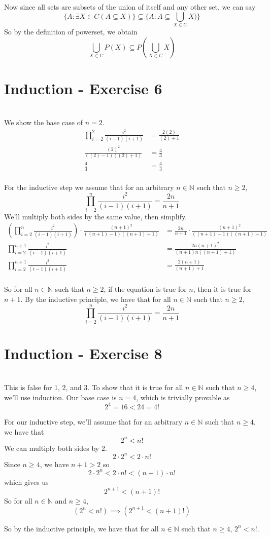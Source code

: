 \documentclass[11pt]{article}
\newcommand{\N}{\mathbb{N}}
\begin{document}
Now since all sets are subsets of the union of itself and any other set, we can say
\[\{A: \exists X\in C(A \subseteq X)\} \subseteq \{A: A \subseteq \bigcup_{X\in C} X)\}\]
So by the definition of powerset, we obtain
\[\displaystyle\bigcup_{X\in C} P(X) \subseteq P(\bigcup_{X\in C} X)\]


\section*{Induction - Exercise 6}
\\

We show the base case of $n=2$.
\begin{align*}
    \prod_{i=2}^2\frac{i^2}{(i-1)(i+1)} &= \frac{2(2)}{(2)+1} \\
    \frac{(2)^2}{((2)-1)((2)+1)} &= \frac{4}{3} \\
    \frac{4}{3} &= \frac{4}{3} \\
\end{align*}

For the inductive step we assume that for an arbitrary $n\in\N$ such that $n\geq2$,
\[\prod_{i=2}^n\frac{i^2}{(i-1)(i+1)} = \frac{2n}{n+1}\]
We'll multiply both sides by the same value, then simplify.
\begin{align*}
    \left(\prod_{i=2}^n\frac{i^2}{(i-1)(i+1)}\right)\cdot\frac{(n+1)^2}{((n+1)-1)((n+1)+1)} &= \frac{2n}{n+1}\cdot\frac{(n+1)^2}{((n+1)-1)((n+1)+1)} \\
    \prod_{i=2}^{n+1}\frac{i^2}{(i-1)(i+1)}&= \frac{2n(n+1)^2}{(n+1)n((n+1)+1)} \\
    \prod_{i=2}^{n+1}\frac{i^2}{(i-1)(i+1)}&= \frac{2(n+1)}{(n+1)+1} \\
\end{align*}

So for all $n\in\N$ such that $n\geq2$, if the equation is true for $n$, then it is true for $n+1$. By the inductive principle, we have that for all $n\in\N$ such that $n\geq2$,
\[\prod_{i=2}^n\frac{i^2}{(i-1)(i+1)} = \frac{2n}{n+1}\]


\section*{Induction - Exercise 8}
\\

This is false for 1, 2, and 3. To show that it is true for all $n\in\N$ such that $n\geq 4$, we'll use induction. Our base case is $n=4$, which is trivially provable as
\[2^4 = 16 < 24 = 4!\]

For our inductive step, we'll assume that for an arbitrary $n\in\N$ such that $n\geq4$, we have that
\[2^n < n!\]
We can multiply both sides by 2.
\[2\cdot2^n < 2\cdot n!\]
Since $n\geq 4$, we have $n+1 > 2$ so
\[2\cdot2^n < 2\cdot n! < (n+1)\cdot n!\]
which gives us
\[2^{n+1} < (n+1)!\]
So for all $n\in\N$ and $n\geq4$,
\[(2^n < n!) \implies (2^{n+1} < (n+1)!)\]

So by the inductive principle, we have that for all $n\in\N$ such that $n\geq4$, $2^n < n!$.
\end{document}
